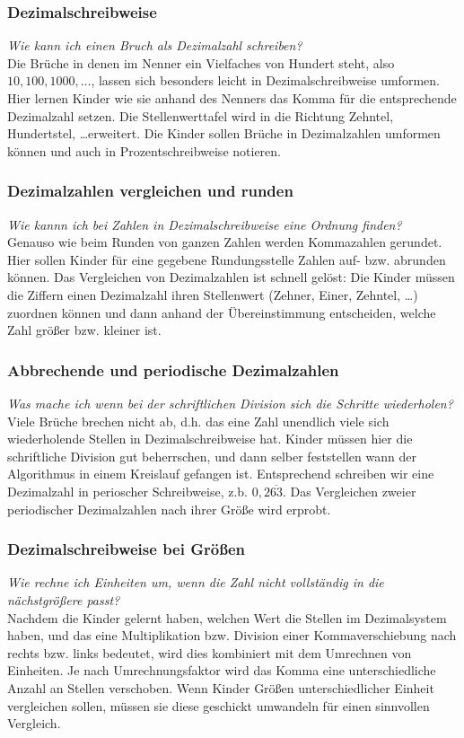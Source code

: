 \documentclass{article}
\begin{document}
\subsubsection*{Dezimalschreibweise}
\textit{Wie kann ich einen Bruch als Dezimalzahl schreiben?}\\
Die Brüche in denen im Nenner ein Vielfaches von Hundert steht, also $10,100,1000,\ldots$, lassen sich besonders leicht in Dezimalschreibweise umformen.
Hier lernen Kinder wie sie anhand des Nenners das Komma für die entsprechende Dezimalzahl setzen.
Die Stellenwerttafel wird in die Richtung Zehntel, Hundertstel, \ldots erweitert. Die Kinder sollen Brüche in Dezimalzahlen umformen können und auch in Prozentschreibweise notieren.
\subsubsection*{Dezimalzahlen vergleichen und runden}
\textit{Wie kannn ich bei Zahlen in Dezimalschreibweise eine Ordnung finden?}\\
Genauso wie beim Runden von ganzen Zahlen werden Kommazahlen gerundet. Hier sollen Kinder für eine gegebene Rundungsstelle Zahlen auf- bzw. abrunden können.
Das Vergleichen von Dezimalzahlen ist schnell gelöst: Die Kinder müssen die Ziffern einen Dezimalzahl ihren Stellenwert (Zehner, Einer, Zehntel, \ldots) zuordnen können und dann anhand der Übereinstimmung entscheiden, welche Zahl größer bzw. kleiner ist.
\subsubsection*{Abbrechende und periodische Dezimalzahlen}
\textit{Was mache ich wenn bei der schriftlichen Division sich die Schritte wiederholen?}\\
Viele Brüche brechen nicht ab, d.h. das eine Zahl unendlich viele sich wiederholende Stellen in Dezimalschreibweise hat.
Kinder müssen hier die schriftliche Division gut beherrschen, und dann selber feststellen wann der Algorithmus in einem Kreislauf gefangen ist.
Entsprechend schreiben wir eine Dezimalzahl in perioscher Schreibweise, z.b. $0,2\overline{63}$.
Das Vergleichen zweier periodischer Dezimalzahlen nach ihrer Größe wird erprobt.
\subsubsection*{Dezimalschreibweise bei Größen}
\textit{Wie rechne ich Einheiten um, wenn die Zahl nicht vollständig in die nächstgrößere passt?}\\
Nachdem die Kinder gelernt haben, welchen Wert die Stellen im Dezimalsystem haben, und das eine Multiplikation bzw. Division einer Kommaverschiebung nach rechts bzw. links bedeutet, wird dies kombiniert mit dem Umrechnen von Einheiten.
Je nach Umrechnungsfaktor wird das Komma eine unterschiedliche Anzahl an Stellen verschoben.
Wenn Kinder Größen unterschiedlicher Einheit vergleichen sollen, müssen sie diese geschickt umwandeln für einen sinnvollen Vergleich.
\end{document}
